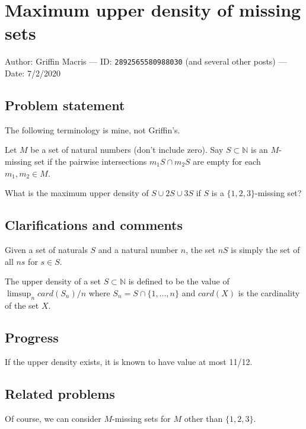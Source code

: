
\section{Maximum upper density of missing sets}

Author: Griffin Macris --- ID: \verb`2892565580988030` (and several other posts) --- Date: 7/2/2020

\subsection{Problem statement}

The following terminology is mine, not Griffin's.

\begin{definition}
  Let $M$ be a set of natural numbers (don't include zero). Say $S\subset\mathbb{N}$ is an $M$-missing set if the pairwise intersections $m_1S\cap m_2S$ are empty for each $m_1,m_2\in M$.
\end{definition}

What is the maximum upper density of $S\cup 2S\cup 3S$ if $S$ is a $\{1,2,3\}$-missing set?

\subsection{Clarifications and comments}

Given a set of naturals $S$ and a natural number $n$, the set $nS$ is simply the set of all $ns$ for $s\in S$.

The upper density of a set $S\subset\mathbb{N}$ is defined to be the value of $\limsup_n card(S_n)/n$ where $S_n=S\cap\{1,\ldots,n\}$ and $card(X)$ is the cardinality of the set $X$.

\subsection{Progress}

If the upper density exists, it is known to have value at most 11/12.

\subsection{Related problems}

Of course, we can consider $M$-missing sets for $M$ other than $\{1,2,3\}$.

